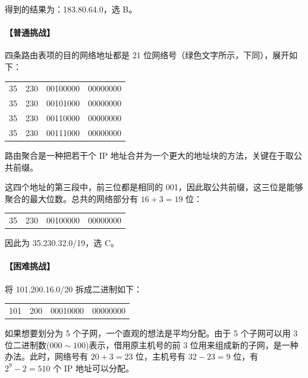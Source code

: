 \documentclass[UTF8]{ctexart}
\newcommand\col[1]{\textcolor{green!50!black}{#1}}
\newcommand\dotting{\ .\ }
\newcommand\Emph[1]{\colorbox{green!10}{\textcolor{green!30!black}{#1}}}
\begin{document}
得到的结果为：183.80.64.0，选 B。

\paragraph{【普通挑战】} 四条路由表项的目的网络地址都是 21 位网络号（\col{绿色}文字所示，下同），展开如下：

\begin{table}[H]
    \centering
    \begin{tabular}{c@{\dotting}c@{\dotting}c@{\dotting}c}
        \col{35} & \col{230} & \col{00100}000 & 00000000 \\
        \col{35} & \col{230} & \col{00101}000 & 00000000 \\
        \col{35} & \col{230} & \col{00110}000 & 00000000 \\
        \col{35} & \col{230} & \col{00111}000 & 00000000 \\
    \end{tabular}
\end{table}

路由聚合是一种把若干个 IP 地址合并为一个更大的地址块的方法，关键在于\Emph{取公共前缀}。

这四个地址的第三段中，前三位都是相同的 \col{001}，因此取公共前缀，这三位是能够聚合的最大位数。总共的网络部分有 $16+3=19$ 位：

\begin{table}[H]
    \centering
    \begin{tabular}{c@{\dotting}c@{\dotting}c@{\dotting}c}
        \col{35} & \col{230} & \col{001}00000 & 00000000 \\
    \end{tabular}
\end{table}

因此为 35.230.32.0/19，选 C。

\paragraph{【困难挑战】} 将 101.200.16.0/20 拆成二进制如下：

\begin{table}[H]
    \centering
    \begin{tabular}{c@{\dotting}c@{\dotting}c@{\dotting}c}
        \col{101} & \col{200} & \col{0001}0000 & 00000000 \\
    \end{tabular}
\end{table}

如果想要划分为 5 个子网，一个直观的想法是\Emph{平均分配}。由于 5 个子网可以用 3 位二进制数($000\sim 100$)表示，借用原主机号的前 3 位用来组成新的子网，是一种办法。此时，网络号有 $20+3=23$ 位，主机号有 $32-23=9$ 位，有 $2^9-2=510$ 个 IP 地址可以分配。
\end{document}
